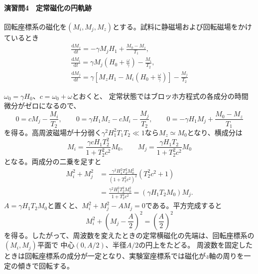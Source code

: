 \documentclass[dvipdfmx,a4paper,11pt]{jsarticle}
\begin{document}
\paragraph{演習問4　定常磁化の円軌跡}
回転座標系の磁化を$(M_i,M_j,M_z)$とする。試料に静磁場および回転磁場をかけているとき
\begin{align}
  \frac{\mathrm{d} M_z}{\mathrm{d} t}= -\gamma M_j H_1 + \frac{M_0-M_z}{T_1},\\
  \frac{\mathrm{d} M_i}{\mathrm{d} t}= \gamma M_j\left(H_0+\frac{\omega}{\gamma}\right) - \frac{M_i}{T_2},\\
  \frac{\mathrm{d} M_j}{\mathrm{d} t}= \gamma \left[M_z H_1 -M_i\left(H_0+\frac{\omega}{\gamma}\right) \right]- \frac{M_j}{T_2}
\end{align}


$\omega_0=\gamma H_0$、$c=\omega_0+\omega$とおくと、
定常状態ではブロッホ方程式の各成分の時間微分がゼロになるので、
\begin{equation}
 0=cM_j-\frac{M_i}{T_2},\qquad
 0=\gamma H_1 M_z-cM_i-\frac{M_j}{T_2},\qquad
 0=-\gamma H_1 M_j+\frac{M_0-M_z}{T_1}
\end{equation}
を得る。高周波磁場が十分弱く$\gamma^2 H_1^2T_1T_2\ll 1$なら$M_z\simeq M_0$となり、横成分は
\begin{equation}
 M_i=\frac{\gamma cH_1T_2^2}{1+T_2^2c^2}M_0,\qquad
 M_j=\frac{\gamma H_1T_2}{1+T_2^2c^2}M_0
\end{equation}
となる。両成分の二乗を足すと
\begin{align}
 M_i^2+M_j^2
 &=\frac{\gamma^2 H_1^2T_2^2M_0^2}{(1+T_2^2c^2)^2}
   (T_2^2c^2+1)\\
 &=\frac{\gamma^2 H_1^2T_2^2M_0^2}{1+T_2^2c^2}
   =(\gamma H_1T_2M_0)M_j.
\end{align}
$A=\gamma H_1T_2M_0$と置くと、$M_i^2+M_j^2-AM_j=0$である。平方完成すると
\begin{equation}
 M_i^2+\left(M_j-\frac{A}{2}\right)^2=\left(\frac{A}{2}\right)^2
\end{equation}
を得る。したがって、周波数を変えたときの定常横磁化の先端は、回転座標系の$(M_i,M_j)$平面で
中心$(0,A/2)$、半径$A/2$の円上をたどる。
周波数を固定したときは回転座標系の成分が一定となり、実験室座標系では磁化が$z$軸の周りを一定の傾きで回転する。
\end{document}
